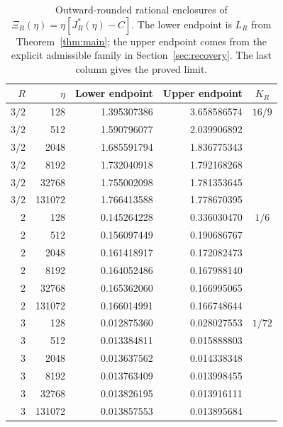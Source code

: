\begin{table}[htbp]
\centering
\small
\caption{Outward-rounded rational enclosures of $\Xi_R(\eta)=\eta[J_R^*(\eta)-C]$. The lower endpoint is $L_R$ from Theorem~\ref{thm:main}; the upper endpoint comes from the explicit admissible family in Section~\ref{sec:recovery}. The last column gives the proved limit.}
\label{tab:enclosures}
\begin{tabular}{rrr r c}
\toprule
$R$ & $\eta$ & Lower endpoint & Upper endpoint & $K_R$ \\
\midrule
$3/2$ & 128 & 1.395307386 & 3.658586574 & $16/9$ \\
$3/2$ & 512 & 1.590796077 & 2.039906892 &  \\
$3/2$ & 2048 & 1.685591794 & 1.836775343 &  \\
$3/2$ & 8192 & 1.732040918 & 1.792168268 &  \\
$3/2$ & 32768 & 1.755002098 & 1.781353645 &  \\
$3/2$ & 131072 & 1.766413588 & 1.778670395 &  \\
\midrule
$2$ & 128 & 0.145264228 & 0.336030470 & $1/6$ \\
$2$ & 512 & 0.156097449 & 0.190686767 &  \\
$2$ & 2048 & 0.161418917 & 0.172082473 &  \\
$2$ & 8192 & 0.164052486 & 0.167988140 &  \\
$2$ & 32768 & 0.165362060 & 0.166995065 &  \\
$2$ & 131072 & 0.166014991 & 0.166748644 &  \\
\midrule
$3$ & 128 & 0.012875360 & 0.028027553 & $1/72$ \\
$3$ & 512 & 0.013384811 & 0.015888803 &  \\
$3$ & 2048 & 0.013637562 & 0.014338348 &  \\
$3$ & 8192 & 0.013763409 & 0.013998455 &  \\
$3$ & 32768 & 0.013826195 & 0.013916111 &  \\
$3$ & 131072 & 0.013857553 & 0.013895684 &  \\
\bottomrule
\end{tabular}
\end{table}
